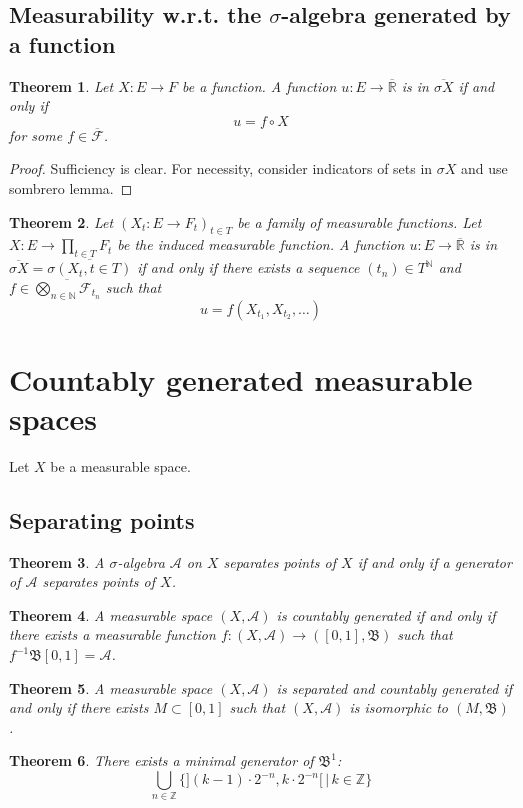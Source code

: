 \documentclass[11pt, a4paper, openany]{book}
\newtheorem{thm}{Theorem}\newtheorem{lem}{Lemma}\newtheorem{crl}{Corollary}
\theoremstyle{definition}
\newcommand{\er}{\overline{\mathbb{R}}}
\begin{document}
\subsection{Measurability w.r.t. the \texorpdfstring{$\sigma$}{sigma}-algebra generated by a function}
    \begin{thm}\label{measurability w.r.t. the sigma algebra generated by a function}
        Let $X:E\rightarrow F$ be a function. A function $u:E\rightarrow \er$ is in $\overline{\sigma X}$ if and only if
        \[
            u=f\circ X
        \]
        for some $f\in \overline{\mathscr{F}}$.
    \end{thm}
    \begin{proof}
        Sufficiency is clear. For necessity, consider indicators of sets in $\sigma X$ and use sombrero lemma.
    \end{proof}
    \begin{thm}
        Let $(X_t:E\rightarrow F_t)_{t\in T}$ be a family of measurable functions. Let $X:E\rightarrow \prod_{t\in T}{F_t}$ be the induced measurable function. A function $u:E\rightarrow \er$ is in $\overline{\sigma X}=\overline{\sigma(X_t,t\in T)}$ if and only if there exists a sequence $(t_n)\in T^\mathbb{N}$ and $f\in \overline{\bigotimes_{n\in\mathbb{N}}{\mathscr{F}_{t_n}}}$ such that
        \[
            u=f(X_{t_1},X_{t_2},\dots)
        \]
    \end{thm}
\section{Countably generated measurable spaces}
    Let $X$ be a measurable space.
\subsection{Separating points}
    \begin{thm}
        A $\sigma$-algebra $\mathscr{A}$ on $X$ separates points of $X$ if and only if a generator of $\mathscr{A}$ separates points of $X$.
    \end{thm}
    \begin{thm}
        A measurable space $(X,\mathscr{A})$ is countably generated if and only if there exists a measurable function $f:(X,\mathscr{A})\rightarrow ([0,1],\mathfrak{B})$ such that $f^{-1}\mathfrak{B}[0,1]=\mathscr{A}$.
    \end{thm}
    \begin{thm}
        A measurable space $(X,\mathscr{A})$ is separated and countably generated if and only if there exists $M\subset [0,1]$ such that $(X,\mathscr{A})$ is isomorphic to $(M,\mathfrak{B})$.
    \end{thm}
    \begin{thm}
        There exists a minimal generator of $\mathfrak{B}^1$:
        \[
            \bigcup_{n\in\mathbb{Z}}\{](k-1)\cdot 2^{-n},k\cdot 2^{-n}[\,|\,k\in\mathbb{Z}\}\mathfrak{}
        \]
    \end{thm}
\end{document}
